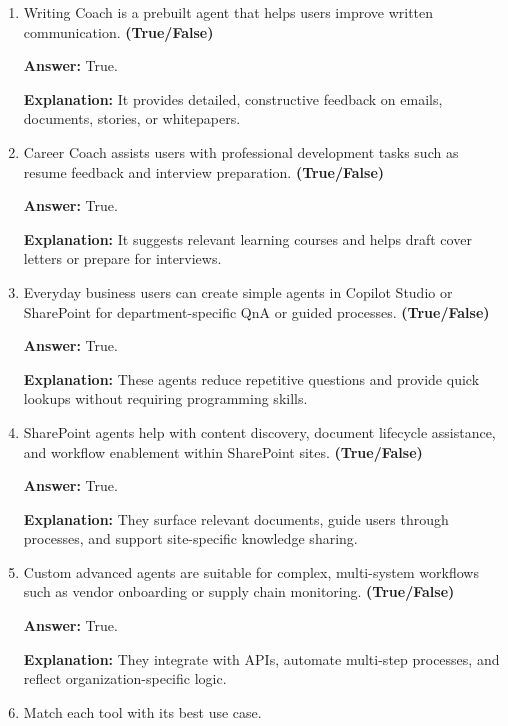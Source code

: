\documentclass[10pt]{article}
\begin{document}
\begin{enumerate}[leftmargin=*]
\textbf{Explanation:} It turns raw numbers into visualizations, statistical insights, and recommendations using natural language queries.

\item Writing Coach is a prebuilt agent that helps users improve written communication. \textbf{(True/False)}

\textbf{Answer:} True.

\textbf{Explanation:} It provides detailed, constructive feedback on emails, documents, stories, or whitepapers.

\item Career Coach assists users with professional development tasks such as resume feedback and interview preparation. \textbf{(True/False)}

\textbf{Answer:} True.

\textbf{Explanation:} It suggests relevant learning courses and helps draft cover letters or prepare for interviews.

\item Everyday business users can create simple agents in Copilot Studio or SharePoint for department-specific QnA or guided processes. \textbf{(True/False)}

\textbf{Answer:} True.

\textbf{Explanation:} These agents reduce repetitive questions and provide quick lookups without requiring programming skills.

\item SharePoint agents help with content discovery, document lifecycle assistance, and workflow enablement within SharePoint sites. \textbf{(True/False)}

\textbf{Answer:} True.

\textbf{Explanation:} They surface relevant documents, guide users through processes, and support site-specific knowledge sharing.

\item Custom advanced agents are suitable for complex, multi-system workflows such as vendor onboarding or supply chain monitoring. \textbf{(True/False)}

\textbf{Answer:} True.

\textbf{Explanation:} They integrate with APIs, automate multi-step processes, and reflect organization-specific logic.

\item Match each tool with its best use case.


\end{enumerate}
\end{document}
